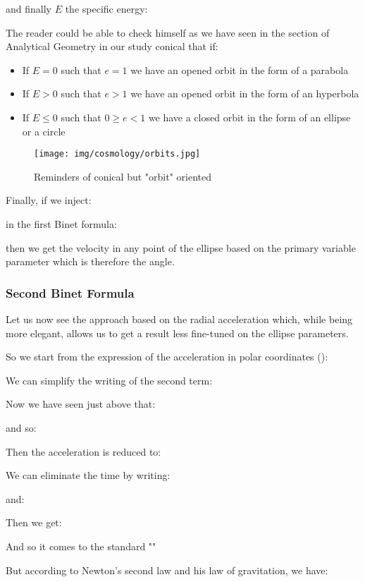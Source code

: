 	and finally $E$ the specific energy:
	
	The reader could be able to check himself as we have seen in the section of Analytical Geometry in our study conical that if:
	\begin{itemize}
		\item If $E=0$ such that $e=1$ we have an opened orbit in the form of a parabola

		\item If $E>0$ such that $e>1$ we have an opened orbit in the form of an hyperbola

		\item If $E\leq 0$ such that $0\geq e <1$ we have a closed orbit in the form of an ellipse or a circle
	\end{itemize}
	\begin{figure}[H]
		\centering
		\texttt{[image: img/cosmology/orbits.jpg]}	
		\caption[]{Reminders of conical but "orbit" oriented}
	\end{figure}
	Finally, if we inject:
	
	in the first Binet formula:
	
	then we get the velocity in any point of the ellipse based on the primary variable parameter which is therefore the angle.
	
	\subsubsection{Second Binet Formula}
	Let us now see the approach based on the radial acceleration which, while being more elegant, allows us to get a result less fine-tuned on the ellipse parameters.

	So we start from the expression of the acceleration in polar coordinates ():
	
	We can simplify the writing of the second term:
	
	Now we have seen just above that:
	
	and so:
	
	Then the acceleration is reduced to:
	
	We can eliminate the time by writing:
	
	and:
	
	Then we get:
	
	And so it comes to the standard ""
	
	But according to Newton's second law and his law of gravitation, we have:
		
